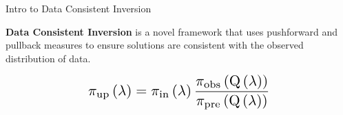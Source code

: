 \begin{block}{Intro to Data Consistent Inversion}
\centering

             {\large \textbf{Data Consistent Inversion} is a novel framework that uses pushforward and pullback measures to ensure solutions are consistent with the observed distribution of data.}

\vspace{0.5cm}
\[ \scalebox{1.5}{$\dci$} \]


\end{block}


